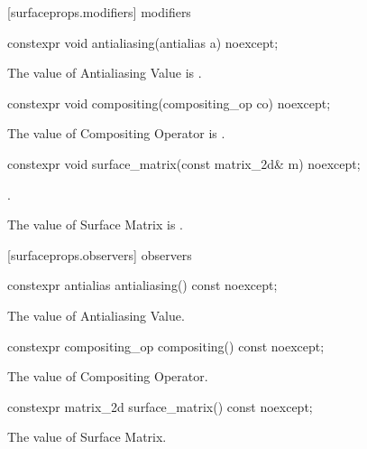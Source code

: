  [surfaceprops.modifiers] { modifiers}

\begin{itemdecl}
constexpr void antialiasing(antialias a) noexcept;
\end{itemdecl}
\begin{itemdescr}
\pnum
\effects
The value of Antialiasing Value is .
\end{itemdescr}

\begin{itemdecl}
constexpr void compositing(compositing_op co) noexcept;
\end{itemdecl}
\begin{itemdescr}
\pnum
\effects
The value of Compositing Operator is .
\end{itemdescr}

\begin{itemdecl}
constexpr void surface_matrix(const matrix_2d& m) noexcept;
\end{itemdecl}
\begin{itemdescr}
\pnum
\preconditions
{}.

\pnum
\effects
The value of Surface Matrix is .
\end{itemdescr}

 [surfaceprops.observers] { observers}

\begin{itemdecl}
constexpr antialias antialiasing() const noexcept;
\end{itemdecl}
\begin{itemdescr}
\pnum
\returns
The value of Antialiasing Value.
\end{itemdescr}

\begin{itemdecl}
constexpr compositing_op compositing() const noexcept;
\end{itemdecl}
\begin{itemdescr}
\pnum
\returns
The value of Compositing Operator.
\end{itemdescr}

\begin{itemdecl}
constexpr matrix_2d surface_matrix() const noexcept;
\end{itemdecl}
\begin{itemdescr}
\pnum
\returns
The value of Surface Matrix.
\end{itemdescr}

